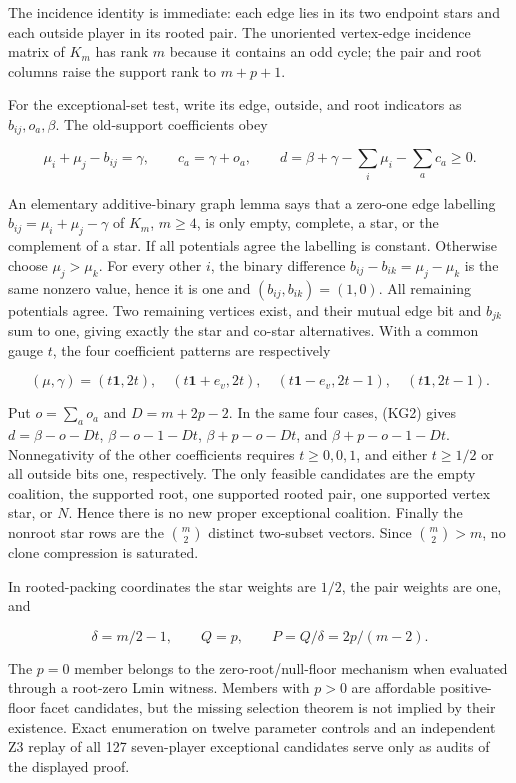 \documentclass[11pt]{article}
\newcommand{\one}{\mathbf 1}
\begin{document}
The incidence identity is immediate: each edge lies in its two endpoint
stars and each outside player in its rooted pair.  The unoriented
vertex-edge incidence matrix of $K_m$ has rank $m$ because it contains an
odd cycle; the pair and root columns raise the support rank to $m+p+1$.

For the exceptional-set test, write its edge, outside, and root indicators
as $b_{ij},o_a,\beta$.  The old-support coefficients obey

\[
 \mu_i+\mu_j-b_{ij}=\gamma,\qquad c_a=\gamma+o_a,\qquad
 d=\beta+\gamma-\sum_i\mu_i-\sum_a c_a\ge0.          \tag{KG2}
\]

An elementary additive-binary graph lemma says that a zero-one edge
labelling $b_{ij}=\mu_i+\mu_j-\gamma$ of $K_m$, $m\ge4$, is only empty,
complete, a star, or the complement of a star.  If all potentials agree the
labelling is constant.  Otherwise choose $\mu_j>\mu_k$.  For every other
$i$, the binary difference
$b_{ij}-b_{ik}=\mu_j-\mu_k$ is the same nonzero value, hence it is one and
$(b_{ij},b_{ik})=(1,0)$.  All remaining potentials agree.  Two remaining
vertices exist, and their mutual edge bit and $b_{jk}$ sum to one, giving
exactly the star and co-star alternatives.  With a common gauge $t$, the four
coefficient patterns are respectively

\[
 (\mu,\gamma)=(t\one,2t),\quad
 (t\one+e_v,2t),\quad(t\one-e_v,2t-1),\quad
 (t\one,2t-1).
\]

Put $o=\sum_a o_a$ and $D=m+2p-2$.  In the same four cases, (KG2) gives
$d=\beta-o-Dt$, $\beta-o-1-Dt$, $\beta+p-o-Dt$, and
$\beta+p-o-1-Dt$.  Nonnegativity of the other coefficients requires
$t\ge0,0,1$, and either $t\ge1/2$ or all outside bits one, respectively.
The only feasible candidates are the empty coalition, the supported root,
one supported rooted pair, one supported vertex star, or $N$.  Hence there
is no new proper exceptional coalition.  Finally the
nonroot star rows are the $\binom m2$ distinct two-subset vectors.  Since
$\binom m2>m$, no clone compression is saturated.

In rooted-packing coordinates the star weights are $1/2$, the pair weights
are one, and

\[
 \delta=m/2-1,\qquad Q=p,\qquad P=Q/\delta=2p/(m-2). \tag{KG3}
\]

The $p=0$ member belongs to the zero-root/null-floor mechanism when evaluated
through a root-zero Lmin witness.  Members with $p>0$ are affordable
positive-floor facet candidates, but the missing selection theorem is not
implied by their existence.  Exact enumeration on twelve parameter controls
and an independent Z3 replay of all 127 seven-player exceptional candidates
serve only as audits of the displayed proof.
\end{document}
